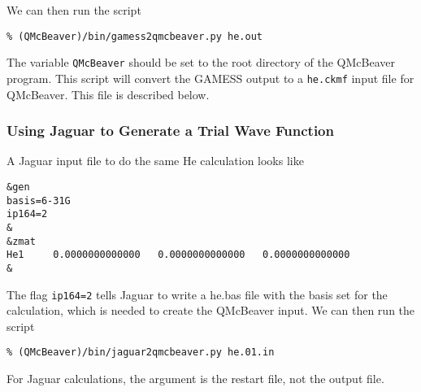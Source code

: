 \documentclass[11pt]{article}
\begin{document}
We can then run the script 
\begin{verbatim}
% (QMcBeaver)/bin/gamess2qmcbeaver.py he.out
\end{verbatim}
The variable \verb-QMcBeaver- should be set to the root 
directory of the QMcBeaver program.  This script will convert the GAMESS
output to a \verb-he.ckmf- input file for QMcBeaver. This file is
described below. 

\subsubsection{Using Jaguar to Generate a Trial Wave Function}
A Jaguar input file to do the same He calculation looks like
\begin{verbatim}
&gen
basis=6-31G
ip164=2
&
&zmat
He1     0.0000000000000   0.0000000000000   0.0000000000000
&
\end{verbatim}

The flag \verb-ip164=2- tells Jaguar to write a he.bas file with the
basis set for the calculation, which is needed to create the QMcBeaver
input.  We can then run the script
\begin{verbatim}
% (QMcBeaver)/bin/jaguar2qmcbeaver.py he.01.in
\end{verbatim}
For Jaguar calculations, the argument is the restart file, not the
output file.
\end{document}

